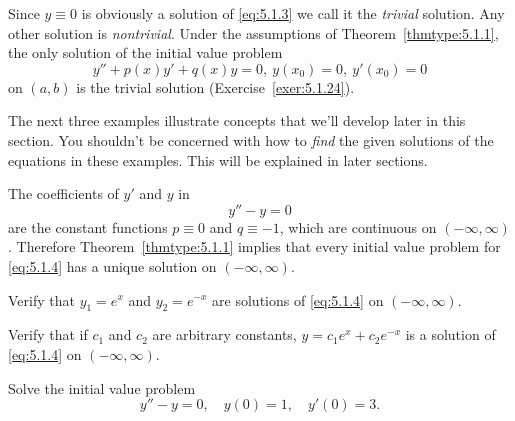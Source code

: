 Since $y\equiv0$ is obviously a solution of \eqref{eq:5.1.3} we call it the {\color{blue}\it
trivial} solution. Any other solution is {\color{blue}\it nontrivial}. Under the assumptions of
Theorem~\ref{thmtype:5.1.1}, the only solution of the initial value problem
\[
  y''+p(x)y'+q(x)y=0,\ y(x_{0})=0,\ y'(x_{0})=0
\]
on $(a,b)$ is the trivial solution (Exercise~\ref{exer:5.1.24}).

The next three examples illustrate concepts that we'll develop later in this section. You shouldn't
be concerned with how to {\color{blue}\it find\/} the given solutions of the equations in these
examples. This will be explained in later sections.

\begin{example}
  \label{example:5.1.1} \rm The coefficients of $y'$ and $y$ in
  \begin{equation}
    \label{eq:5.1.4}y''-y=0
  \end{equation}
  are the constant functions $p\equiv0$ and $q\equiv-1$, which are continuous on $(-\infty,\infty)$.
  Therefore Theorem~\ref{thmtype:5.1.1} implies that every initial value problem for
  \eqref{eq:5.1.4} has a unique solution on $(-\infty,\infty)$.
  \begin{alist}
    \item %
    Verify that $y_{1}=e^{x}$ and $y_{2}=e^{-x}$ are solutions of \eqref{eq:5.1.4} on
    $(-\infty,\infty)$.

    \item %
    Verify that if $c_{1}$ and $c_{2}$ are arbitrary constants, $y=c_{1}e^{x}+c_{2}e^{-x}$ is a
    solution of \eqref{eq:5.1.4} on $(-\infty,\infty)$.

    \item %
    Solve the initial value problem
    \begin{equation}
      \label{eq:5.1.5}y''-y=0,\quad y(0)=1,\quad y'(0)=3.
    \end{equation}
  \end{alist}
\end{example}

